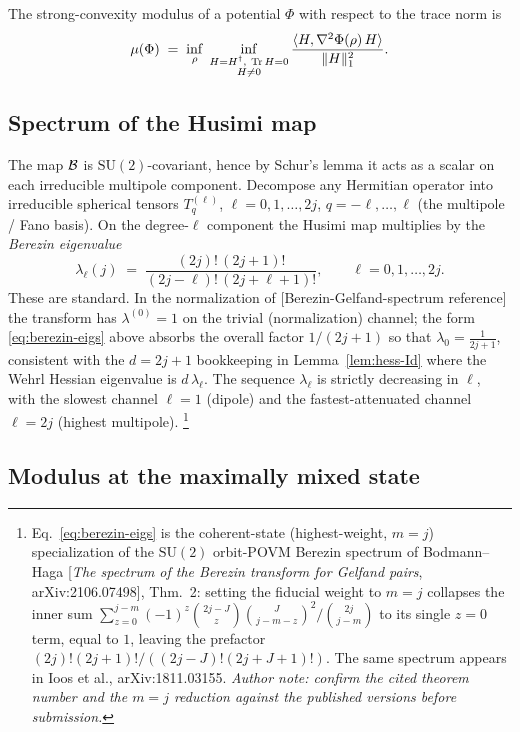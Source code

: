 The strong-convexity modulus of a potential $\Phi$ with respect to the trace
norm is
\begin{equation}
  \mu(\Phi)\;=\;\inf_{\rho}\;\inf_{\substack{H=H^\dagger,\ \Tr H=0\\ H\neq0}}
  \frac{\langle H,\Hess\Phi(\rho)\,H\rangle}{\tnorm{H}^{2}} .
  \label{eq:modulus-def}
\end{equation}

\subsection{Spectrum of the Husimi map}

The map $\mathcal{B}$ is $\mathrm{SU}(2)$-covariant, hence by Schur's lemma it acts
as a scalar on each irreducible multipole component. Decompose any Hermitian
operator into irreducible spherical tensors $T^{(\ell)}_{q}$,
$\ell=0,1,\dots,2j$, $q=-\ell,\dots,\ell$ (the multipole / Fano basis). On the
degree-$\ell$ component the Husimi map multiplies by the
\emph{Berezin eigenvalue}
\begin{equation}
  \lambda_\ell(j)\;=\;\frac{(2j)!\,(2j+1)!}{(2j-\ell)!\,(2j+\ell+1)!},
  \qquad \ell=0,1,\dots,2j.
  \label{eq:berezin-eigs}
\end{equation}
These are standard. In the normalization of [Berezin-Gelfand-spectrum
reference] the transform has $\lambda^{(0)}=1$ on the trivial (normalization)
channel; the form \eqref{eq:berezin-eigs} above absorbs the overall factor
$1/(2j+1)$ so that $\lambda_0=\tfrac{1}{2j+1}$, consistent with the $d=2j+1$
bookkeeping in Lemma~\ref{lem:hess-Id} where the Wehrl Hessian eigenvalue is
$d\,\lambda_\ell$. The sequence $\lambda_\ell$ is strictly decreasing in $\ell$,
with the slowest channel $\ell=1$ (dipole) and the fastest-attenuated channel
$\ell=2j$ (highest multipole).%
\footnote{Eq.~\eqref{eq:berezin-eigs} is the coherent-state (highest-weight,
$m=j$) specialization of the $\mathrm{SU}(2)$ orbit-POVM Berezin spectrum of
Bodmann--Haga [\emph{The spectrum of the Berezin transform for Gelfand pairs},
arXiv:2106.07498], Thm.~2: setting the fiducial weight to $m=j$ collapses the
inner sum $\sum_{z=0}^{j-m}(-1)^z\binom{2j-J}{z}\binom{J}{j-m-z}^2/\binom{2j}{j-m}$
to its single $z=0$ term, equal to $1$, leaving the prefactor
$(2j)!(2j+1)!/((2j-J)!(2j+J+1)!)$. The same spectrum appears in Ioos et al.,
arXiv:1811.03155. \emph{Author note: confirm the cited theorem number and the
$m=j$ reduction against the published versions before submission.}}

\subsection{Modulus at the maximally mixed state}

